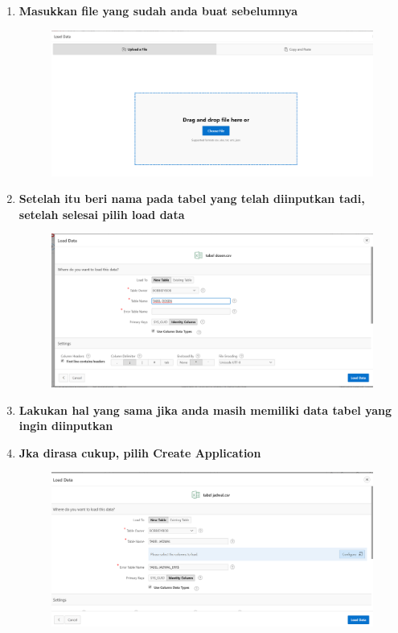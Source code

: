 \begin{enumerate}
\item \textbf{Masukkan file yang sudah anda buat sebelumnya}
\begin{figure}[H]
    \centering
    \includegraphics[scale=0.3]{figures/14.png}
    \label{12}
\end{figure}


\item \textbf{Setelah itu beri nama pada tabel yang telah diinputkan tadi, setelah selesai pilih load data}
\begin{figure}[H]
    \centering
    \includegraphics[scale=0.3]{figures/15.png}
    \label{13}
\end{figure}


\item \textbf{Lakukan hal yang sama jika anda masih memiliki data tabel yang ingin diinputkan}

\item \textbf{Jka dirasa cukup, pilih Create Application}
\begin{figure}[H]
    \centering
    \includegraphics[scale=0.3]{figures/16.png}
    \label{14}
\end{figure}



\end{enumerate}
